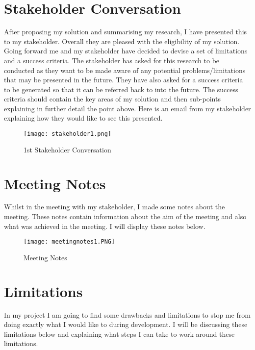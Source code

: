 \documentclass[12pt]{report}
\begin{document}
\pagebreak

\section{Stakeholder Conversation}
After proposing my solution and summarising my research, I have presented this to my stakeholder. Overall they are pleased with the eligibility of my solution. Going forward me and my stakeholder have decided to devise a set of limitations and a success criteria. The stakeholder has asked for this research to be conducted as they want to be made aware of any potential problems/limitations that may be presented in the future. They have also asked for a success criteria to be generated so that it can be referred back to into the future. The success criteria should contain the key areas of my solution and then sub-points explaining in further detail the point above. Here is an email from my stakeholder explaining how they would like to see this presented.

\begin{figure}[ht]
    \centering
    \texttt{[image: stakeholder1.png]}
    \caption{1st Stakeholder Conversation}
    \label{stakeholder1}
\end{figure}

\pagebreak

\section{Meeting Notes}
Whilst in the meeting with my stakeholder, I made some notes about the meeting. These notes contain information about the aim of the meeting and also what was achieved in the meeting. I will display these notes below.

\begin{figure}[H]
    \centering
    \texttt{[image: meetingnotes1.PNG]}
    \caption{Meeting Notes}
    \label{stakeholder1}
\end{figure}

\pagebreak

\section{Limitations}
In my project I am going to find some drawbacks and limitations to stop me from doing exactly what I would like to during development. I will be discussing these limitations below and explaining what steps I can take to work around these limitations. 
\end{document}
